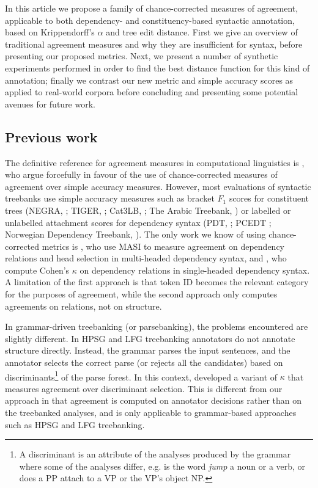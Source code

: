 \documentclass[11pt]{article}
\makeatletter
\let\citeN=\newcite
\let\w=\emph
\def\noparencite#1#2{{#1\if@tempswa , #2\fi}}
\newcommand\citeNP[1]{{\let\@cite=\noparencite\cite{#1}}}
\makeatother
\begin{document}
In this article we propose a family of chance-corrected measures of agreement,
applicable to both dependency- and constituency-based syntactic annotation,
based on Krippendorff's $\alpha$ and tree edit distance. First we give an
overview of traditional agreement measures and why they are insufficient for
syntax, before presenting our proposed metrics. Next, we present a number of
synthetic experiments performed in order to find the best distance function
for this kind of annotation; finally we contrast our new metric and simple
accuracy scores as applied to real-world corpora before concluding and
presenting some potential avenues for future work.

\subsection{Previous work}
The definitive reference for agreement measures in computational linguistics
is \citeN{Art:Poe08}, who argue forcefully in favour of the use of
chance-corrected measures of agreement over simple accuracy measures. However,
most evaluations of syntactic treebanks use simple accuracy measures such as
bracket $F_1$ scores for constituent trees (NEGRA, \citeNP{Brants00b}; TIGER,
\citeNP{Bra:Han02}; Cat3LB, \citeNP{Civit:etal03}; The Arabic Treebank,
\citeNP{Maa:Bie:Kul08}) or labelled or unlabelled attachment scores for
dependency syntax (PDT, \citeNP{Hajic04}; PCEDT \citeNP{Mik:Ste10}; Norwegian
Dependency Treebank, \citeNP{Skjaerholt13}). The only work we know of using
chance-corrected metrics is \citeN{Rag:Dic13}, who use MASI \cite{Passoneau06}
to measure agreement on dependency relations and head selection in
multi-headed dependency syntax, and \citeN{Bha:Sha12}, who compute Cohen's
$\kappa$ \cite{Cohen60} on dependency relations in single-headed dependency
syntax. A limitation of the first approach is that token ID becomes the
relevant category for the purposes of agreement, while the second approach
only computes agreements on relations, not on structure.

In grammar-driven treebanking (or parsebanking), the problems encountered are
slightly different. In HPSG and LFG treebanking annotators do not annotate
structure directly. Instead, the grammar parses the input sentences, and the
annotator selects the correct parse (or rejects all the candidates) based on
discriminants\footnote{A discriminant is an attribute of the analyses produced
by the grammar where some of the analyses differ, e.g. is the word \w{jump} a
noun or a verb, or does a PP attach to a VP or the VP's object NP.} of the
parse forest. In this context, \citeN{deCastro11} developed a variant of
$\kappa$ that measures agreement over discriminant selection. This is
different from our approach in that agreement is computed on annotator
decisions rather than on the treebanked analyses, and is only applicable to
grammar-based approaches such as HPSG and LFG treebanking.
\end{document}

